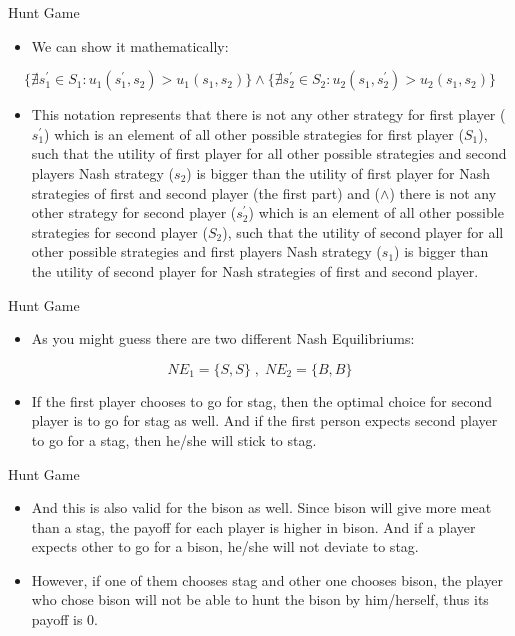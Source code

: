 \documentclass[
  ignorenonframetext,
]{beamer}
\begin{document}
\begin{frame}{Hunt Game}
\protect\hypertarget{hunt-game-1}{}
\begin{itemize}
  \item We can show it mathematically:
\end{itemize}

\[\{\nexists s_1^{'} \in S_1 : u_1(s_1^{'},s_2) > u_1(s_1,s_2)\} \wedge \{\nexists s_2^{'} \in S_2 : u_2(s_1,s_2^{'}) > u_2(s_1,s_2)\}\]

\begin{itemize}
  \item This notation represents that there is not any other strategy for first player ($s_1^{'}$) which is an element of all other possible strategies for first player ($S_1$), such that the utility of first player for all other possible strategies and second players Nash strategy ($s_2$) is bigger than the utility of first player for Nash strategies of first and second player (the first part) and ($\wedge$) there is not any other strategy for second player ($s_2^{'}$) which is an element of all other possible strategies for second player ($S_2$), such that the utility of second player for all other possible strategies and first players Nash strategy ($s_1$) is bigger than the utility of second player for Nash strategies of first and second player.
\end{itemize}
\end{frame}

\begin{frame}{Hunt Game}
\protect\hypertarget{hunt-game-2}{}
\begin{itemize}
  \item As you might guess there are two different Nash Equilibriums:
\end{itemize}

\[NE_1 = \{S,S\} \;,\; NE_2 = \{B,B\}\]

\begin{itemize}
  \item If the first player chooses to go for stag, then the optimal choice for second player is to go for stag as well. And if the first person expects second player to go for a stag, then he/she will stick to stag.
\end{itemize}
\end{frame}

\begin{frame}{Hunt Game}
\protect\hypertarget{hunt-game-3}{}
\begin{itemize}
  \item And this is also valid for the bison as well. Since bison will give more meat than a stag, the payoff for each player is higher in bison. And if a player expects other to go for a bison, he/she will not deviate to stag.
  \item However, if one of them chooses stag and other one chooses bison, the player who chose bison will not be able to hunt the bison by him/herself, thus its payoff is 0. 
\end{itemize}
\end{frame}
\end{document}
